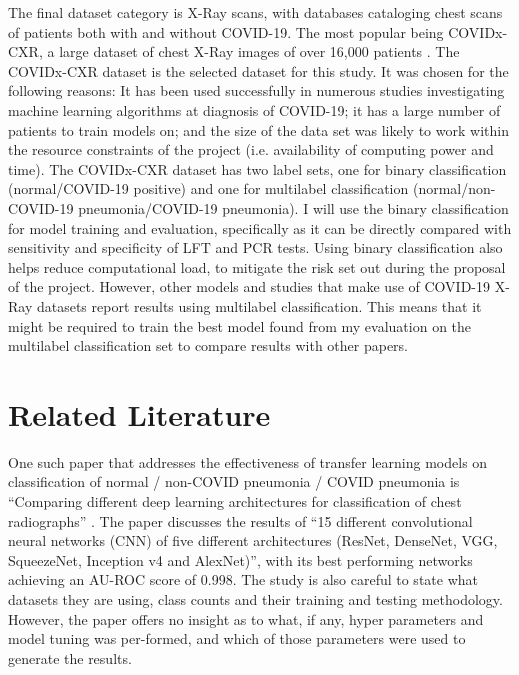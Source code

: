 The final dataset category is X-Ray scans, with databases cataloging chest scans of patients both with and without COVID-19. The most popular being COVIDx-CXR, a large dataset of chest X-Ray images of over 16,000 patients \citep{wang2020covid}. The COVIDx-CXR dataset is the selected dataset for this study. It was chosen for the following reasons: It has been used successfully in numerous studies investigating machine learning algorithms at diagnosis of COVID-19; it has a large number of patients to train models on; and the size of the data set was likely to work within the resource constraints of the project (i.e. availability of computing power and time). The COVIDx-CXR dataset has two label sets, one for binary classification (normal/COVID-19 positive) and one for multilabel classification (normal/non-COVID-19 pneumonia/COVID-19 pneumonia). I will use the binary classification for model training and evaluation, specifically as it can be directly compared with sensitivity and specificity of LFT and PCR tests. Using binary classification also helps reduce computational load, to mitigate the risk set out during the proposal of the project. However, other models and studies that make use of COVID-19 X-Ray datasets report results using multilabel classification. This means that it might be required to train the best model found from my evaluation on the multilabel classification set to compare results with other papers.

\section{Related Literature}
One such paper that addresses the effectiveness of transfer learning models on classification of normal / non-COVID pneumonia / COVID pneumonia is “Comparing different deep learning architectures for classification of chest radiographs” \citep{bressem2020comparing}. The paper discusses the results of “15 different convolutional neural networks (CNN) of five different architectures (ResNet, DenseNet, VGG, SqueezeNet, Inception v4 and AlexNet)”, with its best performing networks achieving an AU-ROC score of 0.998. The study is also careful to state what datasets they are using, class counts and their training and testing methodology. However, the paper offers no insight as to what, if any, hyper parameters and model tuning was per-formed, and which of those parameters were used to generate the results. 

